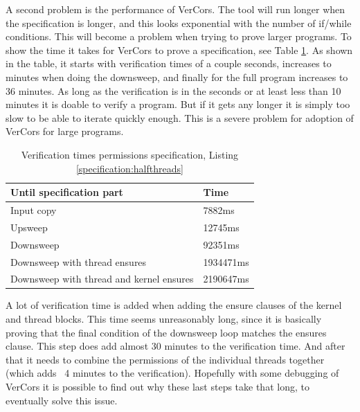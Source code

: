 \documentclass[a4paper]{article}
\begin{document}
A second problem is the performance of VerCors. The tool will run longer when the specification is longer, and this looks exponential with the number of if/while conditions. This will become a problem when trying to prove larger programs. To show the time it takes for VerCors to prove a specification, see Table \ref{table:runTimes}. As shown in the table, it starts with verification times of a couple seconds, increases to minutes when doing the downsweep, and finally for the full program increases to 36 minutes. As long as the verification is in the seconds or at least less than 10 minutes it is doable to verify a program. But if it gets any longer it is simply too slow to be able to iterate quickly enough. This is a severe problem for adoption of VerCors for large programs.

\begin{table}[ht]
	\centering \caption{Verification times permissions specification, Listing \ref{specification:halfthreads}}
	\begin{tabular}{p{80mm}p{20mm}} \hline
		\textbf{Until specification part} & \textbf{Time}\\\hline
		Input copy & 7882ms\\\hline
		Upsweep & 12745ms\\\hline
		Downsweep & 92351ms\\\hline
		Downsweep with thread ensures & 1934471ms\\\hline
		Downsweep with thread and kernel ensures & 2190647ms\\\hline
	\end{tabular}
	\label{table:runTimes}
\end{table}

A lot of verification time is added when adding the ensure clauses of the kernel and thread blocks. This time seems unreasonably long, since it is basically proving that the final condition of the downsweep loop matches the ensures clause. This step does add almost 30 minutes to the verification time. And after that it needs to combine the permissions of the individual threads together (which adds ~4 minutes to the verification). Hopefully with some debugging of VerCors it is possible to find out why these last steps take that long, to eventually solve this issue.
\end{document}
